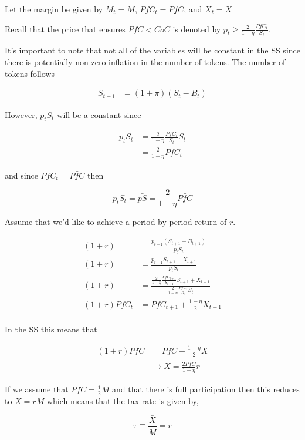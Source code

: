 \documentclass[12pt]{article}
\begin{document}
  Let the margin be given by $M_t = \bar{M}$, $PfC_t = \bar{PfC}$, and $X_t = \bar{X}$

  Recall that the price that ensures $PfC < CoC$ is denoted by
  $p_t \geq \frac{2}{1 - \eta} \frac{PfC_t}{S_t}$.

  It's important to note that not all of the variables will be constant in the SS since there is
  potentially non-zero inflation in the number of tokens. The number of tokens follows

  \begin{align*}
    S_{t+1} &= (1 + \pi) (S_t - B_t)
  \end{align*}

  However, $p_t S_t$ will be a constant since

  \begin{align*}
    p_t S_t &= \frac{2}{1 - \eta} \frac{PfC_t}{S_t} S_t \\
    &= \frac{2}{1 - \eta} PfC_t
  \end{align*}

  and since $PfC_t = \bar{PfC}$ then

  $$p_t S_t = \bar{pS} = \frac{2}{1 - \eta} \bar{PfC}$$

  Assume that we'd like to achieve a period-by-period return of $r$.

  \begin{align*}
    (1 + r) &= \frac{p_{t+1} (S_{t+1} + B_{t+1})}{p_t S_t} \\
    (1 + r) &= \frac{p_{t+1} S_{t+1} + X_{t+1}}{p_t S_t} \\
    (1 + r) &= \frac{\frac{2}{1 - \eta} \frac{PfC_{t+1}}{S_{t+1}} S_{t+1} + X_{t+1}}{\frac{2}{1 - \eta} \frac{PfC_{t}}{S_t} S_t} \\
    (1 + r) PfC_{t} &= PfC_{t+1} + \frac{1 - \eta}{2} X_{t+1} \\
  \end{align*}

  In the SS this means that

  \begin{align*}
    (1 + r) \bar{PfC} &= \bar{PfC} + \frac{1 - \eta}{2} \bar{X} \\
    &\rightarrow \bar{X} = \frac{2 \bar{PfC}}{1 - \eta} r
  \end{align*}

  If we assume that $\bar{PfC} = \frac{1}{2} \bar{M}$ and that there is full participation then this
  reduces to $\bar{X} = r \bar{M}$ which means that the tax rate is given by,

  $$\bar{\tau} \equiv \frac{\bar{X}}{\bar{M}} = r$$
\end{document}
